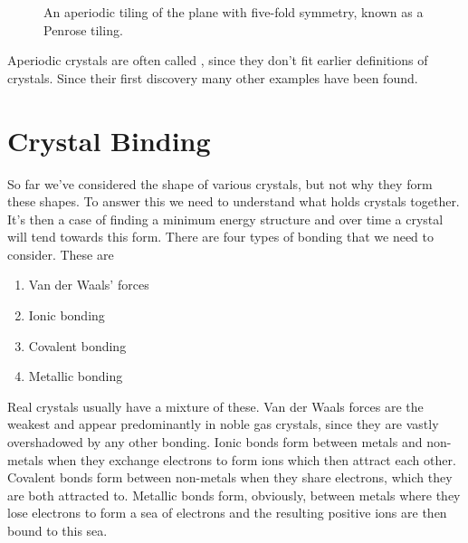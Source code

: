 \documentclass[fleqn]{NotesClass}
\begin{document}
    \begin{figure}
        \caption{An aperiodic tiling of the plane with five-fold symmetry, known as a Penrose tiling.}
    \end{figure}
    
    Aperiodic crystals are often called , since they don't fit earlier definitions of crystals.
    Since their first discovery many other examples have been found.
    
    \chapter{Crystal Binding}\label{sec:crystal binding}
    So far we've considered the shape of various crystals, but not why they form these shapes.
    To answer this we need to understand what holds crystals together.
    It's then a case of finding a minimum energy structure and over time a crystal will tend towards this form.
    There are four types of bonding that we need to consider.
    These are
    \begin{enumerate}
        \item Van der Waals' forces
        \item Ionic bonding
        \item Covalent bonding
        \item Metallic bonding
    \end{enumerate}
    Real crystals usually have a mixture of these.
    Van der Waals forces are the weakest and appear predominantly in noble gas crystals, since they are vastly overshadowed by any other bonding.
    Ionic bonds form between metals and non-metals when they exchange electrons to form ions which then attract each other.
    Covalent bonds form between non-metals when they share electrons, which they are both attracted to.
    Metallic bonds form, obviously, between metals where they lose electrons to form a sea of electrons and the resulting positive ions are then bound to this sea.
    
\end{document}
